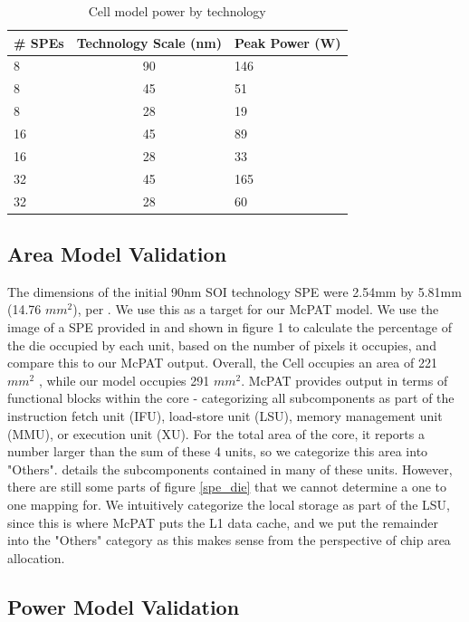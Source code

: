 \documentclass{sig-alternate-05-2015}
\begin{document}
\begin{table}[t]
\centering
\begin{tabular}{| l | c | l |} \hline
\# SPEs & Technology Scale (nm) & Peak Power (W) \\ \hline
8 & 90 & 146 \\ \hline  
8 & 45 & 51 \\ \hline  
8 & 28 & 19 \\ \hline  
16 & 45 & 89 \\ \hline  
16 & 28 & 33 \\ \hline  
32 & 45 & 165 \\ \hline  
32 & 28 & 60 \\ \hline  
\end{tabular}
\label{table:cell_model_power}
\caption{Cell model power by technology}
\end{table}

\subsection{Area Model Validation}

The dimensions of the initial 90nm SOI technology SPE were 2.54mm by 5.81mm (14.76 $mm^2$), per \cite{flachs2006microarchitecture}. We use this as a target for our McPAT model. We use the image of a SPE provided in \cite{flachs2006microarchitecture}  and shown in figure 1 to calculate the percentage of the die occupied by each unit, based on the number of pixels it occupies, and compare this to our McPAT output. Overall, the Cell occupies an area of 221 $mm^2$ \cite{realworldtech} , while our model occupies 291 $mm^2$. McPAT provides output in terms of functional blocks within the core - categorizing all subcomponents as part of the instruction fetch unit (IFU), load-store unit (LSU), memory management unit (MMU), or execution unit (XU). For the total area of the core, it reports a number larger than the sum of these 4 units, so we categorize this area into "Others". \cite{li2009mcpat} details the subcomponents contained in many of these units. However, there are still some parts of figure \ref{spe_die} that we cannot determine a one to one mapping for. We intuitively categorize the local storage as part of the LSU, since this is where McPAT puts the L1 data cache, and we put the remainder into the "Others" category as this makes sense from the perspective of chip area allocation.

\subsection{Power Model Validation}
\end{document}
